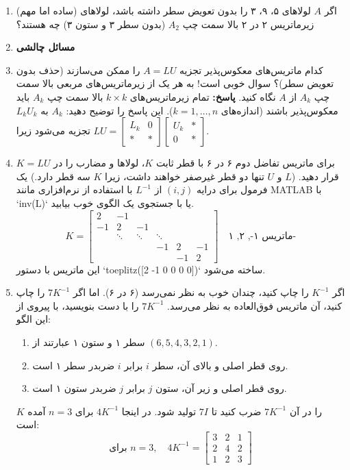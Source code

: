 \documentclass[12pt, a4paper]{book}
\begin{document}
\begin{enumerate}
		\item (ساده اما مهم) اگر $A$ لولاهای ۵، ۹، ۳ را بدون تعویض سطر داشته باشد، لولاهای زیرماتریس ۲ در ۲ بالا سمت چپ $A_2$ (بدون سطر ۳ و ستون ۳) چه هستند؟
		
		\item[] \textbf{مسائل چالشی}
		
		\item کدام ماتریس‌های معکوس‌پذیر تجزیه $A=LU$ را ممکن می‌سازند (حذف بدون تعویض سطر)؟ سوال خوبی است! به هر یک از زیرماتریس‌های مربعی بالا سمت چپ $A_k$ از $A$ نگاه کنید.
		\textbf{پاسخ:} تمام زیرماتریس‌های $k \times k$ بالا سمت چپ $A_k$ باید معکوس‌پذیر باشند (اندازه‌های $k=1, \dots, n$).
		این پاسخ را توضیح دهید: $A_k$ به \underline{$L_kU_k$} تجزیه می‌شود زیرا $LU = \begin{bmatrix} L_k & 0 \\ * & * \end{bmatrix} \begin{bmatrix} U_k & * \\ 0 & * \end{bmatrix}$.
		
		\item برای ماتریس تفاضل دوم ۶ در ۶ با قطر ثابت $K$، لولاها و مضارب را در $K=LU$ قرار دهید. ($L$ و $U$ تنها دو قطر غیرصفر خواهند داشت، زیرا $K$ سه قطر دارد.) یک فرمول برای درایه $(i,j)$ از $L^{-1}$ با استفاده از نرم‌افزاری مانند MATLAB با `inv(L)` یا با جستجوی یک الگوی خوب بیابید.
		\[ K = \begin{bmatrix} 2 & -1 & & & & \\ -1 & 2 & -1 & & & \\ & \ddots & \ddots & \ddots & & \\ & & & -1 & 2 & -1 \\ & & & & -1 & 2 \end{bmatrix} \quad \text{ماتریس ۱-, ۲, ۱-} \]
		این ماتریس با دستور `toeplitz([2 -1 0 0 0 0])` ساخته می‌شود.
		
		\item اگر $K^{-1}$ را چاپ کنید، چندان خوب به نظر نمی‌رسد (۶ در ۶). اما اگر $7K^{-1}$ را چاپ کنید، آن ماتریس فوق‌العاده به نظر می‌رسد. $7K^{-1}$ را با دست بنویسید، با پیروی از این الگو:
		\begin{enumerate}
			\item سطر ۱ و ستون ۱ عبارتند از $(6, 5, 4, 3, 2, 1)$.
			\item روی قطر اصلی و بالای آن، سطر $i$ برابر $i$ ضربدر سطر ۱ است.
			\item روی قطر اصلی و زیر آن، ستون $j$ برابر $j$ ضربدر ستون ۱ است.
		\end{enumerate}
		$K$ را در آن $7K^{-1}$ ضرب کنید تا $7I$ تولید شود. در اینجا $4K^{-1}$ برای $n=3$ آمده است:
		\[ \text{برای } n=3, \quad 4K^{-1} = \begin{bmatrix} 3 & 2 & 1 \\ 2 & 4 & 2 \\ 1 & 2 & 3 \end{bmatrix} \]
	\end{enumerate}
	
\end{document}
